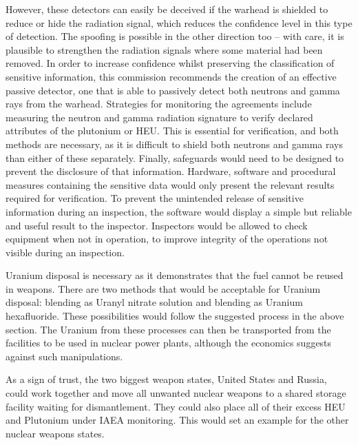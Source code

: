 \documentclass[twoside,titlepage,11pt,twocolumn,a4paper]{article}
\begin{document}
However, these detectors can easily be deceived if the warhead is
shielded to reduce or hide the radiation signal, which reduces the
confidence level in this type of detection. The spoofing is possible
in the other direction too – with care, it is plausible to strengthen
the radiation signals where some material had been removed. In order
to increase confidence whilst preserving the classification of
sensitive information, this commission recommends the creation of an
effective passive detector, one that is able to passively detect both
neutrons and gamma rays from the warhead. Strategies for monitoring
the agreements include measuring the neutron and gamma radiation
signature to verify declared attributes of the plutonium or HEU. This
is essential for verification, and both methods are necessary, as it
is difficult to shield both neutrons and gamma rays than either of
these separately. Finally, safeguards would need to be designed to
prevent the disclosure of that information. Hardware, software and
procedural measures containing the sensitive data would only present
the relevant results required for verification. To prevent the
unintended release of sensitive information during an inspection, the
software would display a simple but reliable and useful result to the
inspector. Inspectors would be allowed to check equipment when not in
operation, to improve integrity of the operations not visible during
an inspection.

Uranium disposal is necessary as it demonstrates that the fuel cannot
be reused in weapons. There are two methods that would be acceptable
for Uranium disposal: blending as Uranyl nitrate solution and blending
as Uranium hexafluoride. These possibilities would follow the
suggested process in the above section. The Uranium from these
processes can then be transported from the facilities to be used in
nuclear power plants, although the economics suggests against such
manipulations.

As a sign of trust, the two biggest weapon states, United States and
Russia, could work together and move all unwanted nuclear weapons to a
shared storage facility waiting for dismantlement. They could also
place all of their excess HEU and Plutonium under IAEA
monitoring. This would set an example for the other nuclear weapons
states.
 

\renewcommand{\refname}{\vspace*{-1.5em}\section{References}\vspace*{-1em}}


\end{document}
